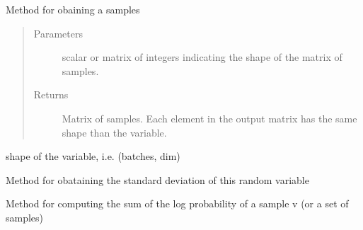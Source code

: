 \documentclass[letterpaper,10pt,english]{sphinxmanual}
\begin{document}
\begin{fulllineitems}
\begin{fulllineitems}
\end{fulllineitems}


\begin{fulllineitems}
\label{\detokenize{modules/inferpy.models:inferpy.models.random_variable.RandomVariable.sample}}
Method for obaining a samples
\begin{quote}\begin{description}
\item[{Parameters}] \leavevmode
{} \textendash{} scalar or matrix of integers indicating the shape of the matrix of samples.

\item[{Returns}] \leavevmode
Matrix of samples. Each element in the output matrix has the same shape than the variable.

\end{description}\end{quote}

\end{fulllineitems}


\begin{fulllineitems}
\label{\detokenize{modules/inferpy.models:inferpy.models.random_variable.RandomVariable.shape}}
shape of the variable, i.e. (batches, dim)

\end{fulllineitems}


\begin{fulllineitems}
\label{\detokenize{modules/inferpy.models:inferpy.models.random_variable.RandomVariable.stddev}}
Method for obataining the standard deviation of this random variable

\end{fulllineitems}


\begin{fulllineitems}
\label{\detokenize{modules/inferpy.models:inferpy.models.random_variable.RandomVariable.sum_log_prob}}
Method for computing the sum of the log probability of a sample v (or a set of samples)


\end{fulllineitems}
\end{fulllineitems}
\end{document}
